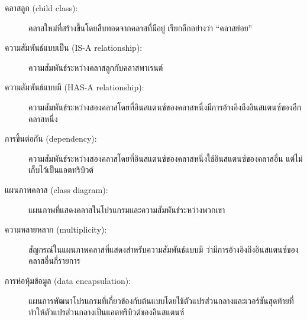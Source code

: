 \begin{description}

\item[คลาสลูก (child class):] คลาสใหม่ที่สร้างขึ้นโดยสืบทอดจากคลาสที่มีอยู่ เรียกอีกอย่างว่า ``คลาสย่อย''


\item[ ความสัมพันธ์แบบเป็น (IS-A relationship):] ความสัมพันธ์ระหว่างคลาสลูกกับคลาสพาเรนต์


\item[ความสัมพันธ์แบบมี (HAS-A relationship):]  ความสัมพันธ์ระหว่างสองคลาสโดยที่อินสแตนซ์ของคลาสหนึ่งมีการอ้างอิงถึงอินสแตนซ์ของอีกคลาสหนึ่ง


\item[การขึ้นต่อกัน (dependency):] ความสัมพันธ์ระหว่างสองคลาสโดยที่อินสแตนซ์ของคลาสหนึ่งใช้อินสแตนซ์ของคลาสอื่น แต่ไม่เก็บไว้เป็นแอตทริบิวต์


\item[แผนภาพคลาส (class diagram):] แผนภาพที่แสดงคลาสในโปรแกรมและความสัมพันธ์ระหว่างพวกเขา


\item[ความหลายหลาก (multiplicity):] สัญกรณ์ในแผนภาพคลาสที่แสดงสำหรับความสัมพันธ์แบบมี ว่ามีการอ้างอิงถึงอินสแตนซ์ของคลาสอื่นกี่รายการ


\item[การห่อหุ้มข้อมูล (data encapsulation):] แผนการพัฒนาโปรแกรมที่เกี่ยวข้องกับต้นแบบโดยใช้ตัวแปรส่วนกลางและเวอร์ชันสุดท้ายที่ทำให้ตัวแปรส่วนกลางเป็นแอตทริบิวต์ของอินสแตนซ์

\end{description}


